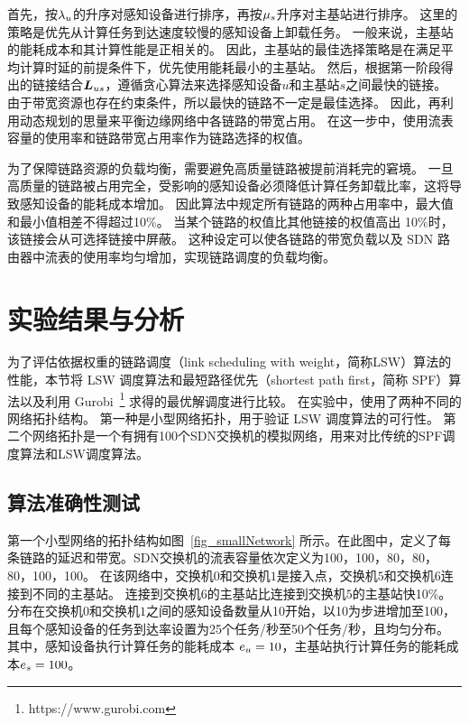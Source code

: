 首先，按${\lambda}_{u}$的升序对感知设备进行排序，再按${\mu}_{s}$升序对主基站进行排序。 这里的策略是优先从计算任务到达速度较慢的感知设备上卸载任务。
一般来说，主基站的能耗成本和其计算性能是正相关的。
因此，主基站的最佳选择策略是在满足平均计算时延的前提条件下，优先使用能耗最小的主基站。
然后，根据第一阶段得出的链接结合$\boldsymbol{L}_{us}$，遵循贪心算法来选择感知设备$u$和主基站$s$之间最快的链接。 
由于带宽资源也存在约束条件，所以最快的链路不一定是最佳选择。
因此，再利用动态规划的思量来平衡边缘网络中各链路的带宽占用。
在这一步中，使用流表容量的使用率和链路带宽占用率作为链路选择的权值。

为了保障链路资源的负载均衡，需要避免高质量链路被提前消耗完的窘境。
一旦高质量的链路被占用完全，受影响的感知设备必须降低计算任务卸载比率，这将导致感知设备的能耗成本增加。
因此算法中规定所有链路的两种占用率中，最大值和最小值相差不得超过10\%。
当某个链路的权值比其他链接的权值高出 10\%时，该链接会从可选择链接中屏蔽。
这种设定可以使各链路的带宽负载以及 SDN 路由器中流表的使用率均匀增加，实现链路调度的负载均衡。




\section{实验结果与分析}

为了评估依据权重的链路调度（link scheduling with weight，简称LSW）算法的性能，本节将 LSW 调度算法和最短路径优先（shortest path first，简称 SPF）算法以及利用 Gurobi~\footnote{https://www.gurobi.com} 求得的最优解调度进行比较。
在实验中，使用了两种不同的网络拓扑结构。
第一种是小型网络拓扑，用于验证 LSW 调度算法的可行性。
第二个网络拓扑是一个有拥有100个SDN交换机的模拟网络，用来对比传统的SPF调度算法和LSW调度算法。

\subsection{算法准确性测试}

第一个小型网络的拓扑结构如图~\ref{fig_smallNetwork} 所示。在此图中，定义了每条链路的延迟和带宽。SDN交换机的流表容量依次定义为100，100，80，80，80，100，100。
在该网络中，交换机$0$和交换机$1$是接入点，交换机$5$和交换机$6$连接到不同的主基站。
连接到交换机$6$的主基站比连接到交换机$5$的主基站快10\%。
分布在交换机$0$和交换机$1$之间的感知设备数量从10开始，以10为步进增加至100，且每个感知设备的任务到达率设置为25个任务/秒至50个任务/秒，且均匀分布。
其中，感知设备执行计算任务的能耗成本 $e_u=10$，主基站执行计算任务的能耗成本$e_s=100$。

